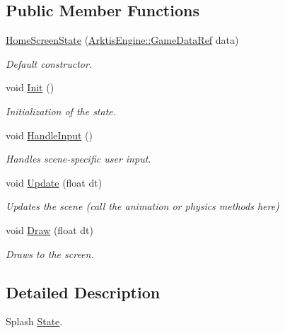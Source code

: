 \subsection*{Public Member Functions}
\begin{DoxyCompactItemize}
\item 
\mbox{\hyperlink{class_states_1_1_home_screen_state_afce4f5145fb10c864de2c3aa86455e40}{Home\+Screen\+State}} (\mbox{\hyperlink{namespace_arktis_engine_a52e783ae007274e2a6eccc201d9400a5}{Arktis\+Engine\+::\+Game\+Data\+Ref}} data)
\begin{DoxyCompactList}\small\item\em Default constructor. \end{DoxyCompactList}\item 
void \mbox{\hyperlink{class_states_1_1_home_screen_state_a96524be599607993ac7abc72727cc9b2}{Init}} ()
\begin{DoxyCompactList}\small\item\em Initialization of the state. \end{DoxyCompactList}\item 
void \mbox{\hyperlink{class_states_1_1_home_screen_state_abaada1fbdd186aea2845ea1d19b66d69}{Handle\+Input}} ()
\begin{DoxyCompactList}\small\item\em Handles scene-\/specific user input. \end{DoxyCompactList}\item 
void \mbox{\hyperlink{class_states_1_1_home_screen_state_a86c27b5c969563bb2d606cdecba1e949}{Update}} (float dt)
\begin{DoxyCompactList}\small\item\em Updates the scene (call the animation or physics methods here) \end{DoxyCompactList}\item 
void \mbox{\hyperlink{class_states_1_1_home_screen_state_aef921fb2964bf40565ba6fd2efacd3b4}{Draw}} (float dt)
\begin{DoxyCompactList}\small\item\em Draws to the screen. \end{DoxyCompactList}\end{DoxyCompactItemize}


\subsection{Detailed Description}
Splash \mbox{\hyperlink{class_states_1_1_state}{State}}. 

